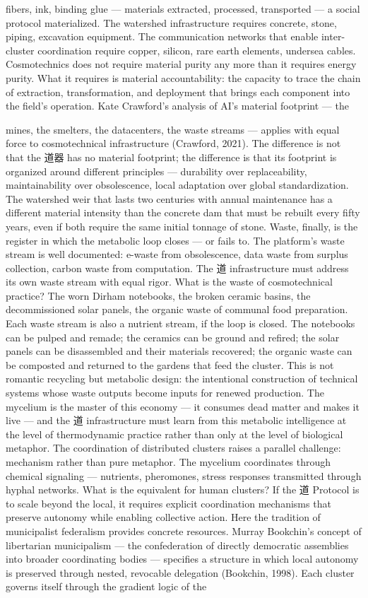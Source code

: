 fibers, ink, binding glue — materials extracted, processed, transported — a social protocol materialized. The watershed infrastructure requires concrete, stone, piping, excavation equipment. The communication networks that enable inter-cluster coordination require copper, silicon, rare earth elements, undersea cables. Cosmotechnics does not require material purity any more than it requires energy purity. What it requires is material accountability: the capacity to trace the chain of extraction, transformation, and deployment that brings each component into the field’s operation. Kate Crawford’s analysis of AI’s material footprint — the

mines, the smelters, the datacenters, the waste streams — applies with equal force to cosmotechnical infrastructure (Crawford, 2021). The difference is not that the 道器 has no material footprint; the difference is that its footprint is organized around different principles — durability over replaceability, maintainability over obsolescence, local adaptation over global standardization. The watershed weir that lasts two centuries with annual maintenance has a different material intensity than the concrete dam that must be rebuilt every fifty years, even if both require the same initial tonnage of stone. Waste, finally, is the register in which the metabolic loop closes — or fails to. The platform’s waste stream is well documented: e-waste from obsolescence, data waste from surplus collection, carbon waste from computation. The 道 infrastructure must address its own waste stream with equal rigor. What is the waste of cosmotechnical practice? The worn Dirham notebooks, the broken ceramic basins, the decommissioned solar panels, the organic waste of communal food preparation. Each waste stream is also a nutrient stream, if the loop is closed. The notebooks can be pulped and remade; the ceramics can be ground and refired; the solar panels can be disassembled and their materials recovered; the organic waste can be composted and returned to the gardens that feed the cluster. This is not romantic recycling but metabolic design: the intentional construction of technical systems whose waste outputs become inputs for renewed production. The mycelium is the master of this economy — it consumes dead matter and makes it live — and the 道 infrastructure must learn from this metabolic intelligence at the level of thermodynamic practice rather than only at the level of biological metaphor. The coordination of distributed clusters raises a parallel challenge: mechanism rather than pure metaphor. The mycelium coordinates through chemical signaling — nutrients, pheromones, stress responses transmitted through hyphal networks. What is the equivalent for human clusters? If the 道 Protocol is to scale beyond the local, it requires explicit coordination mechanisms that preserve autonomy while enabling collective action. Here the tradition of municipalist federalism provides concrete resources. Murray Bookchin’s concept of libertarian municipalism — the confederation of directly democratic assemblies into broader coordinating bodies — specifies a structure in which local autonomy is preserved through nested, revocable delegation (Bookchin, 1998). Each cluster governs itself through the gradient logic of the 